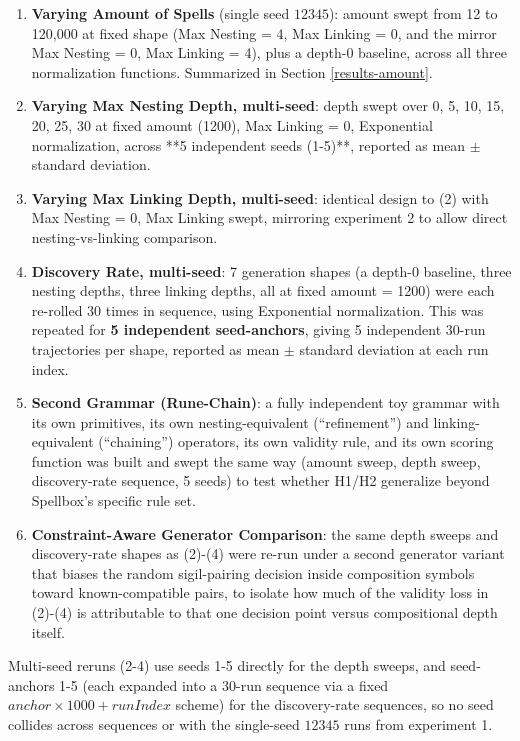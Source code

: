 \documentclass[]{article}
\begin{document}
        \begin{enumerate}
            \item 
                \textbf{Varying Amount of Spells} (single seed $12345$): amount swept from 12 to 120,000 at fixed shape (Max Nesting = 4, Max Linking = 0, and the mirror Max Nesting = 0, Max Linking = 4), plus a depth-0 baseline, across all three normalization functions. Summarized in Section \ref{results-amount}.
            \item 
                \textbf{Varying Max Nesting Depth, multi-seed}: depth swept over {0, 5, 10, 15, 20, 25, 30} at fixed amount (1200), Max Linking = 0, Exponential normalization, across **5 independent seeds (1-5)**, reported as mean $\pm$ standard deviation.
            \item 
                \textbf{Varying Max Linking Depth, multi-seed}: identical design to (2) with Max Nesting = 0, Max Linking swept, mirroring experiment 2 to allow direct nesting-vs-linking comparison.
            \item 
                \textbf{Discovery Rate, multi-seed}: 7 generation shapes (a depth-0 baseline, three nesting depths, three linking depths, all at fixed amount = 1200) were each re-rolled 30 times in sequence, using Exponential normalization. This was repeated for \textbf{5 independent seed-anchors}, giving 5 independent 30-run trajectories per shape, reported as mean $\pm$ standard deviation at each run index.
            \item 
                \textbf{Second Grammar (Rune-Chain)}: a fully independent toy grammar with its own primitives, its own nesting-equivalent (``refinement'') and linking-equivalent (``chaining'') operators, its own validity rule, and its own scoring function was built and swept the same way (amount sweep, depth sweep, discovery-rate sequence, 5 seeds) to test whether H1/H2 generalize beyond Spellbox's specific rule set.
            \item 
                \textbf{Constraint-Aware Generator Comparison}: the same depth sweeps and discovery-rate shapes as (2)-(4) were re-run under a second generator variant that biases the random sigil-pairing decision inside composition symbols toward known-compatible pairs, to isolate how much of the validity loss in (2)-(4) is attributable to that one decision point versus compositional depth itself.
        \end{enumerate}

        Multi-seed reruns (2-4) use seeds 1-5 directly for the depth sweeps, and seed-anchors 1-5 (each expanded into a 30-run sequence via a fixed $anchor \times 1000 + runIndex$ scheme) for the discovery-rate sequences, so no seed collides across sequences or with the single-seed $12345$ runs from experiment 1.
\end{document}
